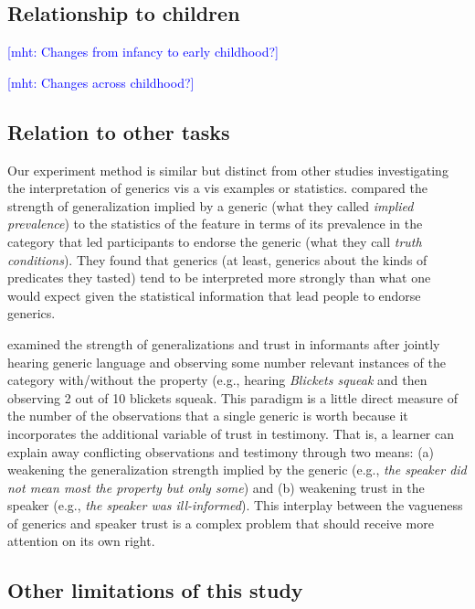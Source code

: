 \documentclass[10pt,letterpaper]{article}
\newcommand{\mht}[1]{\textcolor{Blue}{[mht: #1]}}
\begin{document}
\subsection{Relationship to children}

\mht{Changes from infancy to early childhood?}

\mht{Changes across childhood?}

\subsection{Relation to other tasks}

Our experiment method is similar but distinct from other studies investigating the interpretation of generics vis a vis examples or statistics.
 compared the strength of generalization implied by a generic (what they called \emph{implied prevalence}) to the statistics of the feature in terms of its prevalence in the category that led participants to endorse the generic (what they call \emph{truth conditions}). They found that generics (at least, generics about the kinds of predicates they tasted) tend to be interpreted more strongly than what one would expect given the statistical information that lead people to endorse generics. 

 examined the strength of generalizations and trust in informants after jointly hearing generic language and observing some number relevant instances of the category with/without the property (e.g., hearing \emph{Blickets squeak} and then observing 2 out of 10 blickets squeak.
This paradigm is a little direct measure of the number of the observations that a single generic is worth because it incorporates the additional variable of trust in testimony.
That is, a learner can explain away conflicting observations and testimony through two means: (a) weakening the generalization strength implied by the generic (e.g., \emph{the speaker did not mean most the property but only some}) and (b) weakening trust in the speaker (e.g., \emph{the speaker was ill-informed}). 
This interplay between the vagueness of generics and speaker trust is a complex problem that should receive more attention on its own right. 

\subsection{Other limitations of this study}
\end{document}
